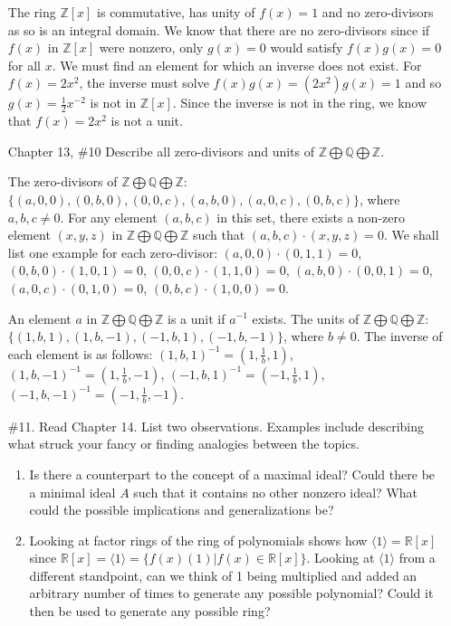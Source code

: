 \documentclass{article}
\newcommand{\Z}{\mathbb Z}
\newcommand{\R}{\mathbb R}
\newcommand{\Q}{\mathbb Q}
\begin{document}
\begin{enumerate}
    \begin{flushleft}
    The ring $\Z[x]$ is commutative, has unity of $f(x) = 1$ and no zero-divisors as so is an integral domain. We know that there are no zero-divisors since if $f(x) $ in $ \Z[x]$ were nonzero, only $g(x) = 0$ would satisfy $f(x)g(x) = 0$ for all $x$. We must find an element for which an inverse does not exist. For $f(x) = 2x^2$, the inverse must solve $f(x)g(x) = (2x^2)g(x) = 1$ and so $g(x) = \frac{1}{2}x^{-2} $ is not in $ \Z[x]$. Since the inverse is not in the ring, we know that $f(x) = 2x^2$ is not a unit.
    \end{flushleft}
    \newpage
    \item[Chapter 13, \#10] Describe all zero-divisors and units of $\Z \bigoplus \Q \bigoplus \Z$.
    
    \begin{flushleft}
    The zero-divisors of $\Z \bigoplus \Q \bigoplus \Z$: $\{(a, 0, 0), (0, b, 0), (0, 0, c), (a, b, 0), (a, 0, c), (0, b, c)\}$, where $a, b, c \not= 0$. For any element $(a, b, c)$ in this set, there exists a non-zero element $(x, y, z) $ in $ \Z \bigoplus \Q \bigoplus \Z$ such that $(a, b, c) \cdot (x, y, z) = 0$. We shall list one example for each zero-divisor: $(a, 0, 0) \cdot (0, 1, 1) = 0$, $(0, b, 0) \cdot (1, 0, 1) = 0$, $(0, 0, c) \cdot (1, 1, 0) = 0$, $(a, b, 0) \cdot (0, 0, 1) = 0$, $(a, 0, c) \cdot (0, 1, 0) = 0$, $(0, b, c) \cdot (1, 0, 0) = 0$.\newline
    
    An element $a $ in $ \Z \bigoplus \Q \bigoplus \Z$ is a unit if $a^{-1}$ exists. The units of $\Z \bigoplus \Q \bigoplus \Z$: $\{(1, b, 1), (1, b, -1), (-1, b, 1), (-1, b, -1)\}$, where $b \not= 0$. The inverse of each element is as follows: $(1, b, 1)^{-1} = (1, \frac{1}{b}, 1)$, $(1, b, -1)^{-1} = (1, \frac{1}{b}, -1)$, $(-1, b, 1)^{-1} = (-1, \frac{1}{b}, 1)$, $(-1, b, -1)^{-1} = (-1, \frac{1}{b}, -1)$.
    \end{flushleft}
    
    \item[\#11.] Read Chapter 14. List two observations. Examples include describing what struck your fancy or finding analogies between the topics.
    
    \begin{enumerate}
        \item Is there a counterpart to the concept of a maximal ideal? Could there be a minimal ideal $A$ such that it contains no other nonzero ideal? What could the possible implications and generalizations be?
        \item Looking at factor rings of the ring of polynomials shows how $\langle 1 \rangle = \R[x]$ since $\R[x] = \langle 1 \rangle = \{f(x)(1) | f(x) \in \R[x]\}$. Looking at $\langle 1 \rangle$ from a different standpoint, can we think of 1 being multiplied and added an arbitrary number of times to generate any possible polynomial? Could it then be used to generate any possible ring? 
    \end{enumerate}
    

\end{enumerate}
\end{document}
